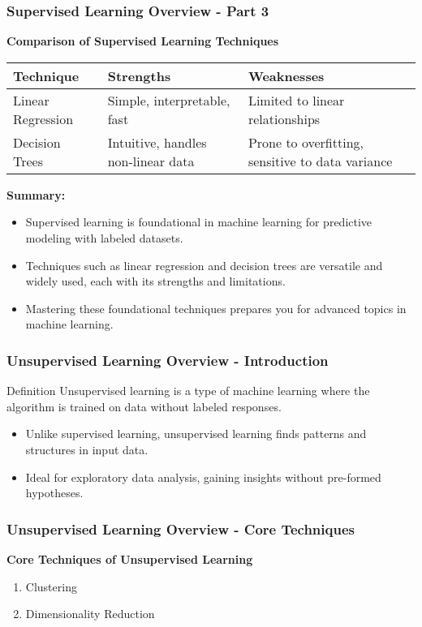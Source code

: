 \documentclass[aspectratio=169]{beamer}
\begin{document}
\begin{frame}[fragile]
    \frametitle{Supervised Learning Overview - Part 3}
    \textbf{Comparison of Supervised Learning Techniques}
    \begin{tabular}{|l|l|l|}
        \hline
        Technique & Strengths & Weaknesses \\
        \hline
        Linear Regression & Simple, interpretable, fast & Limited to linear relationships \\
        \hline
        Decision Trees & Intuitive, handles non-linear data & Prone to overfitting, sensitive to data variance \\
        \hline
    \end{tabular}
    
    \textbf{Summary:}
    \begin{itemize}
        \item Supervised learning is foundational in machine learning for predictive modeling with labeled datasets.
        \item Techniques such as linear regression and decision trees are versatile and widely used, each with its strengths and limitations. 
        \item Mastering these foundational techniques prepares you for advanced topics in machine learning.
    \end{itemize}
\end{frame}

\begin{frame}[fragile]
    \frametitle{Unsupervised Learning Overview - Introduction}
    \begin{block}{Definition}
        Unsupervised learning is a type of machine learning where the algorithm is trained on data without labeled responses. 
    \end{block}
    \begin{itemize}
        \item Unlike supervised learning, unsupervised learning finds patterns and structures in input data.
        \item Ideal for exploratory data analysis, gaining insights without pre-formed hypotheses.
    \end{itemize}
\end{frame}

\begin{frame}[fragile]
    \frametitle{Unsupervised Learning Overview - Core Techniques}
    \textbf{Core Techniques of Unsupervised Learning}
    
    \begin{enumerate}
        \item Clustering
        \item Dimensionality Reduction
    \end{enumerate}
\end{frame}
\end{document}
